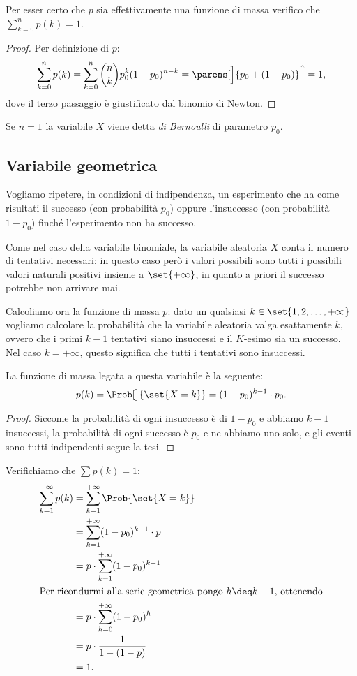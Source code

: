 Per esser certo che $p$ sia effettivamente una funzione di massa verifico che $\displaystyle \sum_{k = 0}^n p(k) = 1$.
\begin{proof}
    Per definizione di $p$:
    \[
        \sum_{k = 0}^n p(k) = \sum_{k = 0}^n \binom{n}{k}p_0^k(1-p_0)^{n-k} = \parens[\Big]{p_0 + (1 - p_0)}^n = 1,
    \] dove il terzo passaggio è giustificato dal binomio di Newton.
\end{proof}

Se $n = 1$ la variabile $X$ viene detta \emph{di Bernoulli} di parametro $p_0$.

\subsection{Variabile geometrica}
Vogliamo ripetere, in condizioni di indipendenza, un esperimento che ha come risultati il successo (con probabilità $p_0$) oppure l'insuccesso (con probabilità $1 - p_0$) finché l'esperimento non ha successo. 

Come nel caso della variabile binomiale, la variabile aleatoria $X$ conta il numero di tentativi necessari: in questo caso però i valori possibili sono tutti i possibili valori naturali positivi insieme a $\set{+\infty}$, in quanto a priori il successo potrebbe non arrivare mai.

Calcoliamo ora la funzione di massa $p$: dato un qualsiasi $k \in \set{1, 2, \dots, +\infty}$ vogliamo calcolare la probabilità che la variabile aleatoria valga esattamente $k$, ovvero che i primi $k-1$ tentativi siano insuccessi e il $K$-esimo sia un successo. Nel caso $k = +\infty$, questo significa che tutti i tentativi sono insuccessi.

La funzione di massa legata a questa variabile è la seguente: \[
    p(k) = \Prob[\big]{\set{X = k}} = (1-p_0)^{k-1} \cdot p_0.
\]
\begin{proof}
    Siccome la probabilità di ogni insuccesso è di $1 - p_0$ e abbiamo $k-1$ insuccessi, la probabilità di ogni successo è $p_0$ e ne abbiamo uno solo, e gli eventi sono tutti indipendenti segue la tesi.
\end{proof}

Verifichiamo che $\sum p(k) = 1$:
\begin{align*}
    \sum_{k=1}^{+\infty} p(k) 
    &= \sum_{k=1}^{+\infty} \Prob{\set{X = k}}\\
    &= \sum_{k=1}^{+\infty} (1 - p_0)^{k-1} \cdot p\\
    &= p \cdot \sum_{k=1}^{+\infty} (1 - p_0)^{k-1}\\
    \intertext{Per ricondurmi alla serie geometrica pongo $h \deq k -1$, ottenendo}
    &= p \cdot \sum_{h=0}^{+\infty} (1 - p_0)^{h}\\
    &= p \cdot \frac{1}{1 - (1-p)}\\
    &= 1.
\end{align*}

